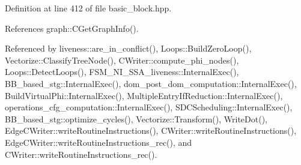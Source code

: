 Definition at line 412 of file basic\+\_\+block.\+hpp.



References graph\+::\+C\+Get\+Graph\+Info().



Referenced by liveness\+::are\+\_\+in\+\_\+conflict(), Loops\+::\+Build\+Zero\+Loop(), Vectorize\+::\+Classify\+Tree\+Node(), C\+Writer\+::compute\+\_\+phi\+\_\+nodes(), Loops\+::\+Detect\+Loops(), F\+S\+M\+\_\+\+N\+I\+\_\+\+S\+S\+A\+\_\+liveness\+::\+Internal\+Exec(), B\+B\+\_\+based\+\_\+stg\+::\+Internal\+Exec(), dom\+\_\+post\+\_\+dom\+\_\+computation\+::\+Internal\+Exec(), Build\+Virtual\+Phi\+::\+Internal\+Exec(), Multiple\+Entry\+If\+Reduction\+::\+Internal\+Exec(), operations\+\_\+cfg\+\_\+computation\+::\+Internal\+Exec(), S\+D\+C\+Scheduling\+::\+Internal\+Exec(), B\+B\+\_\+based\+\_\+stg\+::optimize\+\_\+cycles(), Vectorize\+::\+Transform(), Write\+Dot(), Edge\+C\+Writer\+::write\+Routine\+Instructions(), C\+Writer\+::write\+Routine\+Instructions(), Edge\+C\+Writer\+::write\+Routine\+Instructions\+\_\+rec(), and C\+Writer\+::write\+Routine\+Instructions\+\_\+rec().

